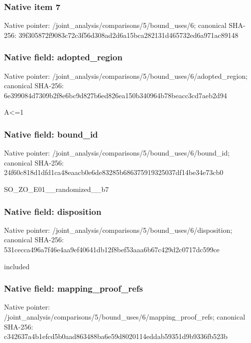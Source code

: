 \documentclass[10pt,a4paper]{article}
\begin{document}
\subsubsection{Native item 7}
Native pointer: /joint\_\allowbreak{}analysis/comparisons/5/bound\_\allowbreak{}uses/6; canonical SHA-256: 39f305872f9083c72c3f56d308ad2d6a15bca282131d465732ed6a971ac89148

\subsubsection{Native field: adopted\_\allowbreak{}region}
Native pointer: /joint\_\allowbreak{}analysis/comparisons/5/bound\_\allowbreak{}uses/6/adopted\_\allowbreak{}region; canonical SHA-256: 6e399084d7309b2f8e6bc9d827b6ed826ea150b340964b78beacc3cd7aeb2d94

\begingroup\raggedright\sloppy A<=\allowbreak{}1\par\endgroup

\subsubsection{Native field: bound\_\allowbreak{}id}
Native pointer: /joint\_\allowbreak{}analysis/comparisons/5/bound\_\allowbreak{}uses/6/bound\_\allowbreak{}id; canonical SHA-256: 24f60c818d1dfd1ca48eaacb0e6de83285b686375919325037df14be34e73cb0

\begingroup\raggedright\sloppy SO\_\allowbreak{}ZO\_\allowbreak{}E01\_\allowbreak{}\_\allowbreak{}randomized\_\allowbreak{}\_\allowbreak{}b7\par\endgroup

\subsubsection{Native field: disposition}
Native pointer: /joint\_\allowbreak{}analysis/comparisons/5/bound\_\allowbreak{}uses/6/disposition; canonical SHA-256: 531cecca496a7f46e4aa9ef40641db12f8bef53aaa6b67c429d2c0717dc599ce

\begingroup\raggedright\sloppy included\par\endgroup

\subsubsection{Native field: mapping\_\allowbreak{}proof\_\allowbreak{}refs}
Native pointer: /joint\_\allowbreak{}analysis/comparisons/5/bound\_\allowbreak{}uses/6/mapping\_\allowbreak{}proof\_\allowbreak{}refs; canonical SHA-256: c342637a4b1efcd5b0aad863488ba6e59d8020114eddab59351d9b9336fb523b
\end{document}
